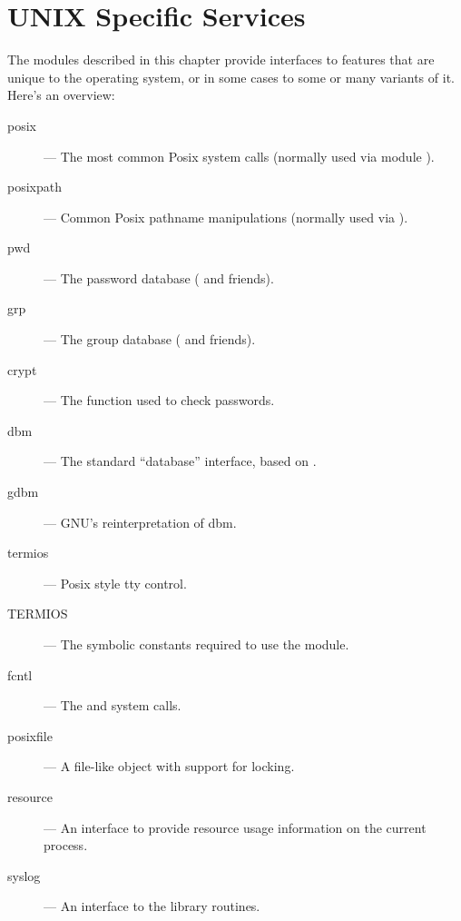 \chapter{UNIX Specific Services}

The modules described in this chapter provide interfaces to features
that are unique to the \UNIX{} operating system, or in some cases to
some or many variants of it.  Here's an overview:

\begin{description}

\item[posix]
--- The most common Posix system calls (normally used via module ).

\item[posixpath]
--- Common Posix pathname manipulations (normally used via ).

\item[pwd]
--- The password database ( and friends).

\item[grp]
--- The group database ( and friends).

\item[crypt]
--- The  function used to check \UNIX{} passwords.

\item[dbm]
--- The standard ``database'' interface, based on .

\item[gdbm]
--- GNU's reinterpretation of dbm.

\item[termios]
--- Posix style tty control.

\item[TERMIOS]
--- The symbolic constants required to use the  module.

\item[fcntl]
--- The  and  system calls.

\item[posixfile]
--- A file-like object with support for locking.

\item[resource]
--- An interface to provide resource usage information on the current
process.

\item[syslog]
--- An interface to the \UNIX{}  library routines.

\end{description}
